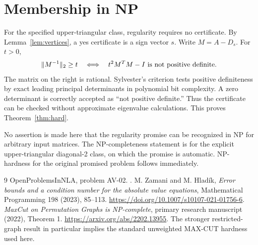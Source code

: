 \section{Membership in NP}
For the specified upper-triangular class, regularity requires no certificate. By Lemma~\ref{lem:vertices}, a yes certificate is a sign vector $s$. Write $M=A-D_s$. For $t>0$,
\[
 \|M^{-1}\|_2\ge t
 \quad\Longleftrightarrow\quad
 t^2M^TM-I\ \hbox{is not positive definite}.
\]
The matrix on the right is rational. Sylvester's criterion tests positive definiteness by exact leading principal determinants in polynomial bit complexity. A zero determinant is correctly accepted as ``not positive definite.'' Thus the certificate can be checked without approximate eigenvalue calculations. This proves Theorem~\ref{thm:hard}.
\begin{remark}
No assertion is made here that the regularity promise can be recognized in NP for arbitrary input matrices. The NP-completeness statement is for the explicit upper-triangular diagonal-2 class, on which the promise is automatic. NP-hardness for the original promised problem follows immediately.
\end{remark}
\begin{thebibliography}{9}
 OpenProblemsInNLA, problem AV-02. .
 M. Zamani and M. Hlad\'ik, \emph{Error bounds and a condition number for the absolute value equations}, Mathematical Programming 198 (2023), 85--113. \url{https://doi.org/10.1007/s10107-021-01756-6}.
 \emph{MaxCut on Permutation Graphs is NP-complete}, primary research manuscript (2022), Theorem 1. \url{https://arxiv.org/abs/2202.13955}. The stronger restricted-graph result in particular implies the standard unweighted MAX-CUT hardness used here.
\end{thebibliography}

